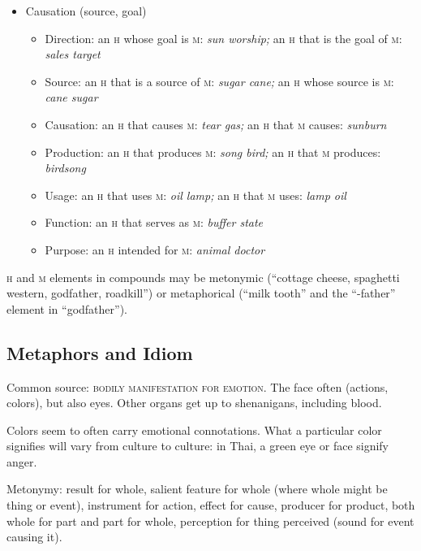 \documentclass[11pt]{article}
\newcommand{\E}[1]{\textit{#1}}   %
\newcommand{\I}[1]{\textsc{#1}}   %
\newenvironment{grammarlist}%
 {\begin{itemize}\addtolength{\itemsep}{-0.5\baselineskip}\ignorespaces}%
 {\end{itemize}\ignorespacesafterend}
\begin{document}
\begin{grammarlist}
\begin{grammarlist}
      \item Topic: an \I{h} that is about \I{m}: \E{history book}
    \end{grammarlist}
  \item Causation (source, goal)
    \begin{grammarlist}
      \item Direction: an \I{h} whose goal is \I{m}: \E{sun worship;}
        an \I{h} that is the goal of \I{m}: \E{sales target}
      \item Source: an \I{h} that is a source of \I{m}: \E{sugar cane;}
        an \I{h} whose source is \I{m}: \E{cane sugar}
      \item Causation: an \I{h} that causes \I{m}: \E{tear gas;}
        an \I{h} that \I{m} causes: \E{sunburn}
      \item Production: an \I{h} that produces \I{m}: \E{song bird;}
        an \I{h} that \I{m} produces: \E{birdsong}
      \item Usage: an \I{h} that uses \I{m}: \E{oil lamp;}
        an \I{h} that \I{m} uses: \E{lamp oil}
      \item Function: an \I{h} that serves as \I{m}: \E{buffer state}
      \item Purpose: an \I{h} intended for \I{m}: \E{animal doctor}
    \end{grammarlist}
\end{grammarlist}

\noindent \I{h} and \I{m} elements in compounds may be metonymic
(``cottage cheese, spaghetti western, godfather, roadkill'') or
metaphorical (``milk tooth'' and the ``-father'' element in
``godfather'').


\subsection{Metaphors and Idiom}
Common source: \I{bodily manifestation for emotion}. The face often
(actions, colors), but also eyes. Other organs get up to shenanigans,
including blood.

Colors seem to often carry emotional connotations.  What a
particular color signifies will vary from culture to culture: in Thai,
a green eye or face signify anger.

Metonymy: result for whole, salient feature for whole (where whole
might be thing or event), instrument for action, effect for cause,
producer for product, both whole for part and part for whole,
perception for thing perceived (sound for event causing it).
\end{document}
